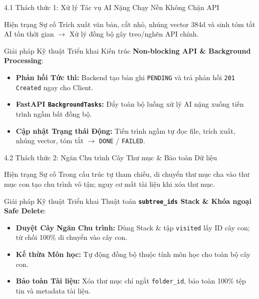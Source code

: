 \documentclass[10pt, aspectratio=169]{beamer}
\begin{document}
\begin{frame}{4.1 Thách thức 1: Xử lý Tác vụ AI Nặng Chạy Nền Không Chặn API}
    \begin{block}{Hiện trạng Sự cố}
        Trích xuất văn bản, cắt nhỏ, nhúng vector 384d và sinh tóm tắt AI tốn thời gian $\rightarrow$ Xử lý đồng bộ gây treo/nghẽn API chính.
    \end{block}

    \vspace{0.15cm}
    \begin{alertblock}{Giải pháp Kỹ thuật Triển khai}
        Kiến trúc \textbf{Non-blocking API \& Background Processing}:
        \begin{itemize}
            \item \textbf{Phản hồi Tức thì:} Backend tạo bản ghi \texttt{PENDING} và trả phản hồi \texttt{201 Created} ngay cho Client.
            \item \textbf{FastAPI \texttt{BackgroundTasks}:} Đẩy toàn bộ luồng xử lý AI nặng xuống tiến trình ngầm bất đồng bộ.
            \item \textbf{Cập nhật Trạng thái Động:} Tiến trình ngầm tự đọc file, trích xuất, nhúng vector, tóm tắt $\rightarrow$ \texttt{DONE} / \texttt{FAILED}.
        \end{itemize}
    \end{alertblock}
\end{frame}

\begin{frame}{4.2 Thách thức 2: Ngăn Chu trình Cây Thư mục \& Bảo toàn Dữ liệu}
    \begin{block}{Hiện trạng Sự cố}
        Trong cấu trúc tự tham chiếu, di chuyển thư mục cha vào thư mục con tạo chu trình vô tận; nguy cơ mất tài liệu khi xóa thư mục.
    \end{block}

    \vspace{0.15cm}
    \begin{alertblock}{Giải pháp Kỹ thuật Triển khai}
        Thuật toán \textbf{\texttt{subtree\_ids} Stack \& Khóa ngoại Safe Delete}:
        \begin{itemize}
            \item \textbf{Duyệt Cây Ngăn Chu trình:} Dùng Stack \& tập \texttt{visited} lấy ID cây con; từ chối 100\% di chuyển vào cây con.
            \item \textbf{Kế thừa Môn học:} Tự động đồng bộ thuộc tính môn học cho toàn bộ cây con.
            \item \textbf{Bảo toàn Tài liệu:} Xóa thư mục chỉ ngắt \texttt{folder\_id}, bảo toàn 100\% tệp tin và metadata tài liệu.
        \end{itemize}
    \end{alertblock}
\end{frame}
\end{document}
